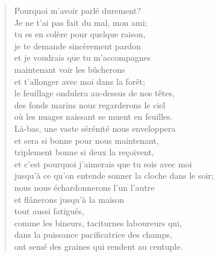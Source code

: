 \documentclass[11pt]{extbook}
\newcommand*{\centeredornament}{\centerline{\pgfornament[width=6cm]{88}}}
\begin{document}
\newpage


\vspace*{-15mm}
\centeredornament



\begin{verse}
  Pourquoi m'avoir parlé durement? \\
  Je ne t'ai pas fait du mal, mon ami; \\
  tu es en colère pour quelque raison, \\
  je te demande sincèrement pardon \\
  et je voudrais que tu m'accompagnes \\
  maintenant voir les bûcherons \\
  et t'allonger avec moi dans la forêt; \\
  le feuillage ondulera au-dessus de nos têtes, \\
  des fonds marins nous regarderons le ciel \\
  où les nuages naissant se muent en feuilles. \\
  Là-bas, une vaste sérénité nous enveloppera \\
  et sera si bonne pour nous maintenant, \\
  triplement bonne si deux la reçoivent, \\
  et c'est pourquoi j'aimerais que tu sois avec moi \\
  jusqu'à ce qu'on entende sonner la cloche dans le soir; \\
  nous nous échardonnerons l'un l'autre \\
  et flânerons jusqu'à la maison \\
  tout aussi fatigués, \\
  comme les bineurs, taciturnes laboureurs qui,\hspace*{-1mm} \\
  dans la puissance pacificatrice des champs, \\
  ont semé des graines qui rendent au centuple.
\end{verse}

\newpage

\vspace*{-15mm}
\centeredornament


\end{document}
